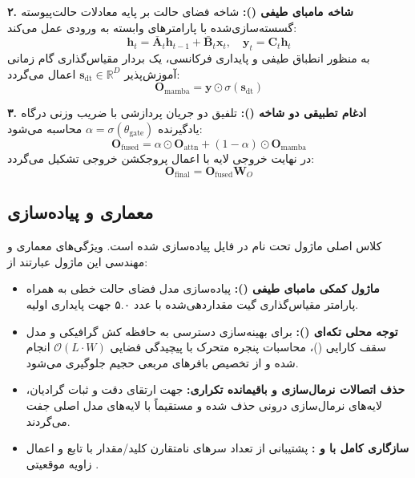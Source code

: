 \textbf{۲. شاخه مامبای طیفی ():}
شاخه فضای حالت بر پایه معادلات حالت‌پیوسته گسسته‌سازی‌شده با پارامترهای وابسته به ورودی عمل می‌کند:
\begin{equation}
\mathbf{h}_t = \mathbf{\bar{A}}_t \mathbf{h}_{t-1} + \mathbf{\bar{B}}_t \mathbf{x}_t, \quad \mathbf{y}_t = \mathbf{C}_t \mathbf{h}_t
\end{equation}
به منظور انطباق طیفی و پایداری فرکانسی، یک بردار مقیاس‌گذاری گام زمانی آموزش‌پذیر $\mathbf{s}_{\text{dt}} \in \mathbb{R}^D$ اعمال می‌گردد:
\begin{equation}
\mathbf{O}_{\text{mamba}} = \mathbf{y} \odot \sigma(\mathbf{s}_{\text{dt}})
\end{equation}

\textbf{۳. ادغام تطبیقی دو شاخه ():}
تلفیق دو جریان پردازشی با ضریب وزنی درگاه یادگیرنده $\alpha = \sigma(\theta_{\text{gate}})$ محاسبه می‌شود:
\begin{equation}
\mathbf{O}_{\text{fused}} = \alpha \odot \mathbf{O}_{\text{attn}} + (1 - \alpha) \odot \mathbf{O}_{\text{mamba}}
\end{equation}
در نهایت خروجی لایه با اعمال پروجکشن خروجی تشکیل می‌گردد:
\begin{equation}
\mathbf{O}_{\text{final}} = \mathbf{O}_{\text{fused}} \mathbf{W}_O
\end{equation}

\subsection{معماری و پیاده‌سازی}
کلاس اصلی ماژول تحت نام  در فایل  پیاده‌سازی شده است. ویژگی‌های معماری و مهندسی این ماژول عبارتند از:
\begin{itemize}
    \item \textbf{ماژول کمکی مامبای طیفی ():} پیاده‌سازی مدل فضای حالت خطی به همراه پارامتر مقیاس‌گذاری گیت  مقداردهی‌شده با عدد ۵.۰ جهت پایداری اولیه.
    \item \textbf{توجه محلی تکه‌ای ():} برای بهینه‌سازی دسترسی به حافظه کش گرافیکی و مدل سقف کارایی ()، محاسبات پنجره متحرک با پیچیدگی فضایی $\mathcal{O}(L \cdot W)$ انجام شده و از تخصیص بافرهای مربعی حجیم جلوگیری می‌شود.
    \item \textbf{حذف اتصالات نرمال‌سازی و باقیمانده تکراری:} جهت ارتقای دقت و ثبات گرادیان، لایه‌های نرمال‌سازی درونی حذف شده و مستقیماً با لایه‌های مدل اصلی جفت می‌گردند.
    \item \textbf{سازگاری کامل با  و :} پشتیبانی از تعداد سرهای نامتقارن کلید/مقدار با تابع  و اعمال زاویه موقعیتی .
\end{itemize}

